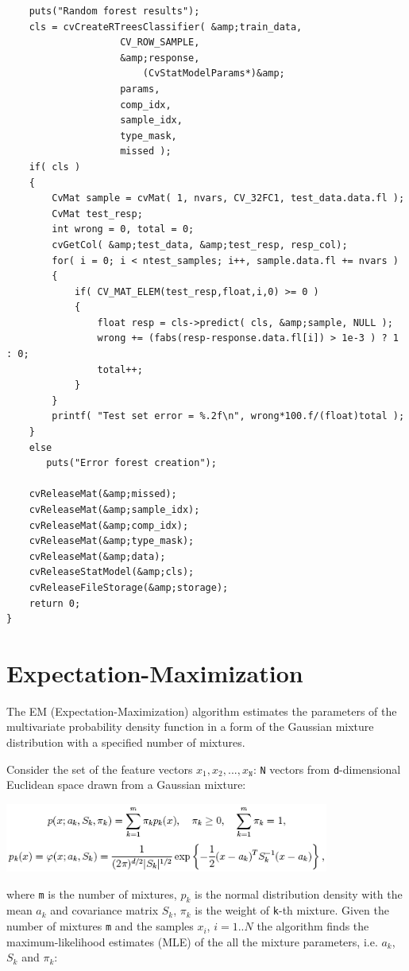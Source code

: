 \begin{lstlisting}
    puts("Random forest results");
    cls = cvCreateRTreesClassifier( &amp;train_data, 
				    CV_ROW_SAMPLE, 
				    &amp;response,
        			    (CvStatModelParams*)&amp; 
				    params, 
				    comp_idx, 
				    sample_idx, 
				    type_mask, 
				    missed );
    if( cls )
    {
        CvMat sample = cvMat( 1, nvars, CV_32FC1, test_data.data.fl );
        CvMat test_resp;
        int wrong = 0, total = 0;
        cvGetCol( &amp;test_data, &amp;test_resp, resp_col);
        for( i = 0; i < ntest_samples; i++, sample.data.fl += nvars )
        {
            if( CV_MAT_ELEM(test_resp,float,i,0) >= 0 )
            {
                float resp = cls->predict( cls, &amp;sample, NULL );
                wrong += (fabs(resp-response.data.fl[i]) > 1e-3 ) ? 1 : 0;
                total++;
            }
        }
        printf( "Test set error = %.2f\n", wrong*100.f/(float)total );
    }
    else
       puts("Error forest creation");

    cvReleaseMat(&amp;missed);
    cvReleaseMat(&amp;sample_idx);
    cvReleaseMat(&amp;comp_idx);
    cvReleaseMat(&amp;type_mask);
    cvReleaseMat(&amp;data);
    cvReleaseStatModel(&amp;cls);
    cvReleaseFileStorage(&amp;storage);
    return 0;
}
\end{lstlisting}

\section{Expectation-Maximization}

The EM (Expectation-Maximization) algorithm estimates the parameters of the multivariate probability density function in a form of the Gaussian mixture distribution with a specified number of mixtures.

Consider the set of the feature vectors {$x_1, x_2,...,x_\texttt{N}$}: \texttt{N} vectors from \texttt{d}-dimensional Euclidean space drawn from a Gaussian mixture:

\includegraphics[width=0.8\textwidth]{pics/em1.png}

where \texttt{m} is the number of mixtures, $p_k$ is the normal distribution density with the mean $a_k$ and covariance matrix $S_k$, $\pi_k$ is the weight of \texttt{k}-th mixture. Given the number of mixtures \texttt{m} and the samples {$x_i$, $i=1..N$} the algorithm finds the maximum-likelihood estimates (MLE) of the all the mixture parameters, i.e. $a_k$, $S_k$ and $\pi_k$:

